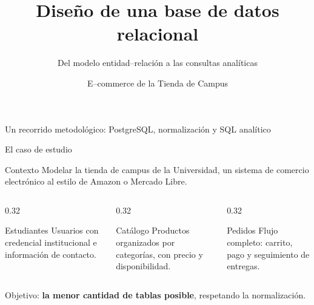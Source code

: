 \documentclass[aspectratio=169,10pt]{beamer}
\title[Base de datos Tienda UR]{Diseño de una base de datos relacional}
\subtitle{Del modelo entidad--relación a las consultas analíticas}
\author[Tienda UR]{E--commerce de la Tienda de Campus}
\institute[UR]{Universidad del Rosario \textperiodcentered\ Ingeniería de Datos}
\date{}
\begin{document}
{
\begin{frame}[plain]
  \titlepage
  \begin{center}
    \small\color{urGris}
    Un recorrido metodológico: PostgreSQL, normalización y SQL analítico
  \end{center}
\end{frame}}

\begin{frame}{El caso de estudio}
  \begin{block}{Contexto}
    Modelar la tienda de campus de la Universidad, un sistema de comercio
    electrónico al estilo de Amazon o Mercado Libre.
  \end{block}
  \vspace{0.3em}
  \begin{columns}[t]
    \begin{column}{0.32\textwidth}
      \begin{block}{Estudiantes}
        Usuarios con credencial institucional e información de contacto.
      \end{block}
    \end{column}
    \begin{column}{0.32\textwidth}
      \begin{block}{Catálogo}
        Productos organizados por categorías, con precio y disponibilidad.
      \end{block}
    \end{column}
    \begin{column}{0.32\textwidth}
      \begin{block}{Pedidos}
        Flujo completo: carrito, pago y seguimiento de entregas.
      \end{block}
    \end{column}
  \end{columns}
  \vspace{0.4em}
  \begin{center}
    \small\color{urGris}
    Objetivo: \textbf{la menor cantidad de tablas posible}, respetando la normalización.
  \end{center}
\end{frame}
\end{document}

